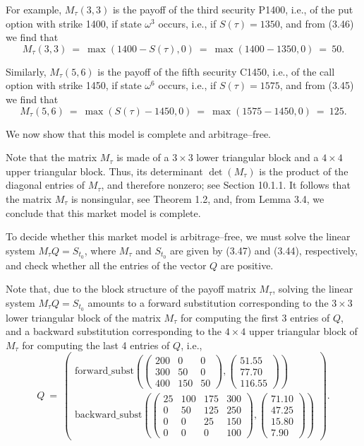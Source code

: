 For example, $M_\tau(3,3)$ is the payoff of the third security P1400,
i.e., of the put option with strike 1400, if state $\omega^3$ occurs,
i.e., if $S(\tau) = 1350$, and from (3.46) we find that
\[
M_\tau(3,3) \ = \ \max(1400-S(\tau),0) \ = \ \max(1400-1350,0) \ = \ 50.
\]

Similarly, $M_\tau(5,6)$ is the payoff of the fifth security C1450,
i.e., of the call option with strike 1450, if state $\omega^6$ occurs,
i.e., if $S(\tau) = 1575$, and from (3.45) we find that
\[
M_\tau(5,6) \ = \ \max(S(\tau)-1450,0) \ = \ \max(1575-1450,0) \ = \ 125.
\]

We now show that this model is complete and arbitrage--free.

Note that the matrix $M_\tau$ is made of a $3 \times 3$ lower triangular
block and a $4 \times 4$ upper triangular block. Thus, its determinant
$\det(M_\tau)$ is the product of the diagonal entries of $M_\tau$, and
therefore nonzero; see Section 10.1.1. It follows that the matrix
$M_\tau$ is nonsingular, see Theorem 1.2, and, from Lemma 3.4, we
conclude that this market model is complete.

To decide whether this market model is arbitrage--free, we must solve
the linear system $M_\tau Q = S_{t_0}$, where $M_\tau$ and $S_{t_0}$ are
given by (3.47) and (3.44), respectively, and check whether all the
entries of the vector $Q$ are positive.

Note that, due to the block structure of the payoff matrix $M_\tau$,
solving the linear system $M_\tau Q = S_{t_0}$ amounts to a forward
substitution corresponding to the $3 \times 3$ lower triangular block of
the matrix $M_\tau$ for computing the first 3 entries of $Q$, and a
backward substitution corresponding to the $4 \times 4$ upper triangular
block of $M_\tau$ for computing the last 4 entries of $Q$, i.e.,
\[
Q \ = \ \left(
\begin{array}{l}
\text{forward\_subst}\!\left(
\begin{pmatrix} 200 & 0 & 0 \\ 300 & 50 & 0 \\ 400 & 150 & 50 \end{pmatrix},
\begin{pmatrix} 51.55 \\ 77.70 \\ 116.55 \end{pmatrix}
\right) \\[3em]
\text{backward\_subst}\!\left(
\begin{pmatrix} 25 & 100 & 175 & 300 \\ 0 & 50 & 125 & 250 \\ 0 & 0 & 25 & 150 \\ 0 & 0 & 0 & 100 \end{pmatrix},
\begin{pmatrix} 71.10 \\ 47.25 \\ 15.80 \\ 7.90 \end{pmatrix}
\right)
\end{array}
\right).
\]
